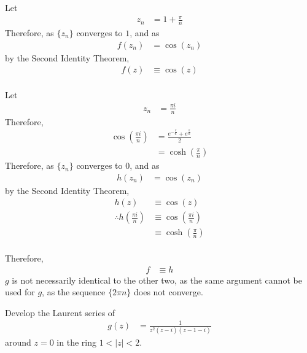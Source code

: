 \documentclass[titlepage, fleqn, a4paper, 12pt, twoside]{article}
\theoremstyle{definition}
\theoremstyle{theorem}
\begin{document}
\begin{solution}
	Let
	\begin{align*}
		z_n & = 1 + \frac{\pi}{n}
	\end{align*}
	Therefore, as $\{z_n\}$ converges to $1$, and as
	\begin{align*}
		f(z_n) & = \cos(z_n)
	\end{align*}
	by the Second Identity Theorem,
	\begin{align*}
		f(z) & \equiv \cos(z)
	\end{align*}
	~\\
	Let
	\begin{align*}
		z_n & = \frac{\pi i}{n}
	\end{align*}
	Therefore,
	\begin{align*}
		\cos\left( \frac{\pi i}{n} \right) & = \frac{e^{-\frac{\pi}{n}} + e^{\frac{\pi}{n}}}{2} \\
                                                   & = \cosh\left( \frac{\pi}{n} \right)
	\end{align*}
	Therefore, as $\{z_n\}$ converges to $0$, and as
	\begin{align*}
		h(z_n) & = \cos(z_n)
	\end{align*}
	by the Second Identity Theorem,
	\begin{align*}
		h(z)                                       & \equiv \cos(z)                            \\
		\therefore h\left( \frac{\pi i}{n} \right) & \equiv \cos\left( \frac{\pi i}{n} \right) \\
                                                           & \equiv \cosh\left( \frac{\pi}{n} \right)
	\end{align*}
	~\\
	Therefore,
	\begin{align*}
		f & \equiv h
	\end{align*}
	$g$ is not necessarily identical to the other two, as the same argument cannot be used for $g$, as the sequence $\{2 \pi n\}$ does not converge.
\end{solution}

\begin{question}{13}
	Develop the Laurent series of
	\begin{align*}
		g(z) & = \frac{1}{z^2 (z - i) (z - 1 - i)}
	\end{align*}
	around $z = 0$ in the ring $1 < |z| < 2$.
\end{question}
\end{document}
